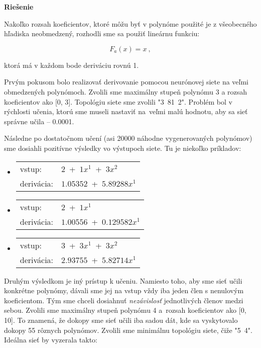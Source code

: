 \documentclass[12pt]{article}
\newcommand{\mysmallsection}[1]{\vspace{0.5cm}{\centering\large\textbf{#1}\\}\normalsize\vspace{0.5cm}}
\newcommand*\arc{{\fontfamily{pbk}\fontseries{db}\selectfont+}}
\begin{document}
{\vspace*{0.5cm}\centering\textbf{Riešenie}\\}

Nakoľko rozsah koeficientov, ktoré môžu byť v polynóme použité je z všeobecného hľadiska neobmedzený, rozhodli sme sa použiť lineárnu funkciu: 

\begin{equation}
F_a(x)=x~,
\end{equation}

\noindent ktorá má v každom bode deriváciu rovnú 1.  

\mysmallsection{Výsledky}

Prvým pokusom bolo realizovať derivovanie pomocou neurónovej siete na veľmi obmedzených polynómoch. Zvolili sme maximálny stupeň polynómu 3 a rozsah koeficientov ako [0, 3]. Topológiu siete sme zvolili "3~81~2". Problém bol v rýchlosti učenia, ktorú sme museli nastaviť na~veľmi malú hodnotu, aby sa sieť správne učila -- 0.0001.

Následne po dostatočnom učení (asi 20000 náhodne vygenerovaných polynómov) sme dosiahli pozitívne výsledky vo výstupoch siete. Tu je niekoľko príkladov:

\begin{itemize}
\item \begin{tabular}{ l l }
		vstup: & $2$~\arc~$1x^1$~\arc~$3x^2$\\
		derivácia: & $1.05352$~\arc~$5.89288x^1 $
	  \end{tabular}
\item \begin{tabular}{ l l }
		vstup: & $2$~\arc~$1x^1$\\
		derivácia: & $1.00556$~\arc~$0.129582x^1$
	  \end{tabular}
\item \begin{tabular}{ l l }
		vstup: & $3$~\arc~$3x^1$~\arc~$3x^2$\\
		derivácia: & $2.93755$~\arc~$5.82714x^1$
	  \end{tabular}
\end{itemize}

Druhým výsledkom je iný prístup k učeniu. Namiesto toho, aby sme sieť učili konkrétne polynómy, dávali sme jej na vstup vždy iba jeden člen s nenulovým koeficientom. Tým sme chceli dosiahnuť \textit{nezávislosť} jednotlivých členov medzi sebou. Zvolili sme maximálny stupeň polynómu 4 a~rozsah koeficientov ako [0, 10]. To znamená, že dokopy sme sieť učili iba sadou dát, kde sa vyskytovalo dokopy 55 rôznych polynómov. Zvolili sme minimálnu topológiu siete, čiže "5~4". Ideálna sieť by vyzerala takto:
\end{document}
